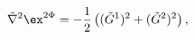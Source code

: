 \begin{equation}
   \tilde{\nabla}^2\ex^{2\Phi} = 
      - \frac{1}{2}\left((\tilde{G}^1)^2 +(\tilde{G}^2)^2\right) ,  
\end{equation}


